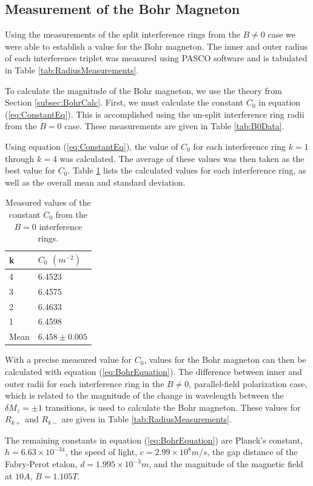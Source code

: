 \documentclass[twocolumn]{article}
\begin{document}
	\subsection{Measurement of the Bohr Magneton} \label{subsec:BohrMagneton}
		Using the measurements of the split interference rings from the $B\neq 0$ case we were able to establish a value for the Bohr magneton.
		The inner and outer radius of each interference triplet was measured using PASCO software and is tabulated in Table \ref{tab:RadiusMeasurements}.
		
		To calculate the magnitude of the Bohr magneton, we use the theory from Section \ref{subsec:BohrCalc}.
		First, we must calculate the constant $C_0$ in equation (\ref{eq:ConstantEq}).
		This is accomplished using the un-split interference ring radii from the $B=0$ case.
		These measurements are given in Table \ref{tab:B0Data}.
		
		Using equation (\ref{eq:ConstantEq}), the value of $C_0$ for each interference ring $k=1$ through $k=4$ was calculated.
		The average of these values was then taken as the best value for $C_0$.
		Table \ref{tab:C0} lists the calculated values for each interference ring, as well as the overall mean and standard deviation.
		
		\begin{table}[]
			\centering
			\begin{tabular}{l|l}
				k & $C_0$ $(m^{-2})$ \\ \hline
				4 & 6.4523 \\
				3 & 6.4575 \\
				2 & 6.4633 \\
				1 & 6.4598 \\ \hline
				Mean & $6.458\pm0.005$
			\end{tabular}
			\caption{Measured values of the constant $C_0$ from the $B=0$ interference rings.}
			\label{tab:C0}
		\end{table}
		
		With a precise measured value for $C_0$, values for the Bohr magneton can then be calculated with equation (\ref{eq:BohrEquation}).
		The difference between inner and outer radii for each interference ring in the $B\neq 0$, parallel-field polarization case, which is related to the magnitude of the change in wavelength between the $\delta M_z = \pm1$ transitions, is used to calculate the Bohr magneton.
		These values for $R_{k+}$ and $R_{k-}$ are given in Table \ref{tab:RadiusMeasurements}.
		
		The remaining constants in equation (\ref{eq:BohrEquation}) are Planck's constant, $h = 6.63\times10^{-34}$, the speed of light, $c = 2.99\times10^8 m/s$, the gap distance of the Fabry-Perot etalon, $d = 1.995\times10^{-3} m$, and the magnitude of the magnetic field at $10 A$, $B = 1.105 T$.
		
\end{document}

